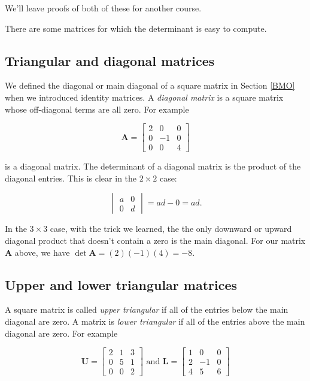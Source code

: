\documentclass[
]{book}
\theoremstyle{definition}
\theoremstyle{definition}
\theoremstyle{definition}
\theoremstyle{definition}
\theoremstyle{remark}
\begin{document}
We'll leave proofs of both of these for another course.

There are some matrices for which the determinant is easy to compute.

\subsection*{Triangular and diagonal matrices}\label{triangular-and-diagonal-matrices}

We defined the diagonal or main diagonal of a square matrix in Section \ref{BMO} when we introduced identity matrices. A \emph{diagonal matrix} is a square matrix whose off-diagonal terms are all zero. For example

\[\mathbf{A}=\begin{bmatrix}
2 & 0 & 0\\0 & -1 & 0\\0 & 0 & 4\end{bmatrix}\]

is a diagonal matrix. The determinant of a diagonal matrix is the product of the diagonal entries. This is clear in the \(2\times 2\) case:

\[\begin{vmatrix} a & 0\\0 & d\end{vmatrix}=ad-0=ad.\]

In the \(3\times 3\) case, with the trick we learned, the the only downward or upward diagonal product that doesn't contain a zero is the main diagonal. For our matrix \(\mathbf{A}\) above, we have \(\det \mathbf{A}=(2)(-1)(4)=-8.\)

\subsection*{Upper and lower triangular matrices}\label{upper-and-lower-triangular-matrices}

A square matrix is called \emph{upper triangular} if all of the entries below the main diagonal are zero. A matrix is \emph{lower triangular} if all of the entries above the main diagonal are zero. For example

\[\mathbf{U}=\begin{bmatrix}
2 & 1 & 3\\0 & 5 & 1\\0 & 0 & 2\end{bmatrix} \text{ and }
\mathbf{L}=\begin{bmatrix}
1 & 0 & 0\\2 & -1 & 0\\4 & 5 & 6\end{bmatrix}\]
\end{document}
